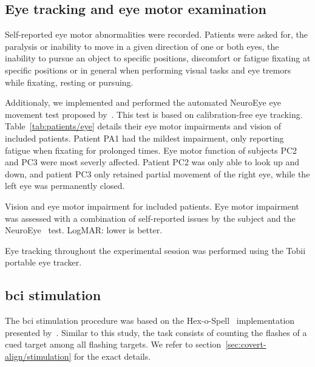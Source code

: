 \subsection{Eye tracking and eye motor examination}

Self-reported eye motor abnormalities were recorded.
Patients were asked for, the paralysis or inability to move in a given
direction of one or both eyes, the inability to pursue an object to specific
positions, discomfort or fatigue fixating at specific positions or in general
when performing visual tasks and eye tremors while fixating, resting or
pursuing.

Additionaly, we implemented and performed the automated NeuroEye eye movement
test proposed by~\textcite{Hassan2022}.
This test is based on calibration-free eye tracking.
Table~\ref{tab:patients/eye} details their eye motor impairments and vision of
included patients.
Patient PA1 had the mildest impairment, only reporting fatigue when fixating
for prolonged times.
Eye motor function of subjects PC2 and PC3 were most severly affected.
Patient PC2 was only able to look up and down, and patient PC3 only retained
partial movement of the right eye, while the left eye was permanently closed.

\begin{table}[t]
  \centering
  \footnotesize
  
  \caption{Vision and eye motor impairment for included patients.
  Eye motor impairment was assessed with a combination of self-reported issues
  by the subject and the NeuroEye~\cite{Hasan2022} test.
  LogMAR: lower is better.}
  \label{tab:patients/eye}
\end{table}


Eye tracking throughout the experimental session was performed using the Tobii~
portable eye tracker.

\subsection{\Ac{bci} stimulation}

The \ac{bci} stimulation procedure was based on the
Hex-o-Spell~\cite{Treder2010} implementation presented
by~\textcite{VanDenKerchove2024}.
Similar to this study, the task consists of counting the flashes of a cued
target among all flashing targets.
We refer to section~\ref{sec:covert-align/stimulation} for the exact details.

